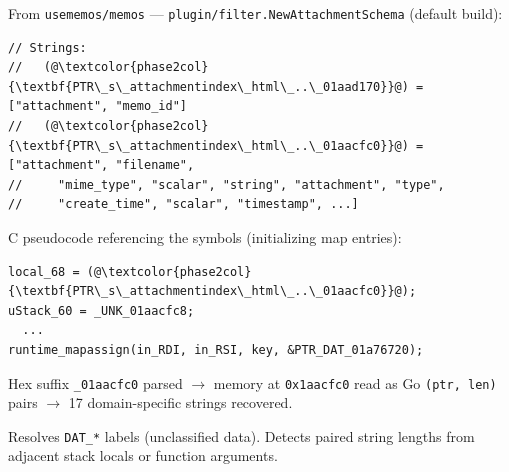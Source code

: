\documentclass[border=10pt]{standalone}
\newcommand{\phasegap}{\vspace{8pt}}
\begin{document}
\begin{varwidth}{16cm}
\begin{tcolorbox}
\tcblower

{\scriptsize\sffamily\color{labelgray} From \texttt{usememos/memos} --- \texttt{plugin/filter.NewAttachmentSchema} (default build):}
\vspace{2pt}
\begin{lstlisting}[style=annot]
// Strings:
//   (@\textcolor{phase2col}{\textbf{PTR\_s\_attachmentindex\_html\_..\_01aad170}}@) = ["attachment", "memo_id"]
//   (@\textcolor{phase2col}{\textbf{PTR\_s\_attachmentindex\_html\_..\_01aacfc0}}@) = ["attachment", "filename",
//     "mime_type", "scalar", "string", "attachment", "type",
//     "create_time", "scalar", "timestamp", ...]
\end{lstlisting}
\vspace{2pt}
{\scriptsize\sffamily\color{labelgray} C pseudocode referencing the symbols (initializing map entries):}
\begin{lstlisting}[style=cstyle]
local_68 = (@\textcolor{phase2col}{\textbf{PTR\_s\_attachmentindex\_html\_..\_01aacfc0}}@);
uStack_60 = _UNK_01aacfc8;
  ...
runtime_mapassign(in_RDI, in_RSI, key, &PTR_DAT_01a76720);
\end{lstlisting}
{\scriptsize\sffamily\color{labelgray} Hex suffix \texttt{\_01aacfc0} parsed $\to$ memory at \texttt{0x1aacfc0} read as Go \texttt{(ptr, len)} pairs $\to$ 17 domain-specific strings recovered.}
\end{tcolorbox}

\phasegap

\begin{tcolorbox}[
    title={\sffamily\bfseries Heuristic 3: DAT Symbols},
    colframe=phase3col, colback=codebg, colbacktitle=phase3col!15!white,
    coltitle=phase3col, fonttitle=\small,
    width=16cm, boxrule=0.5pt, left=3pt, right=3pt, top=2pt, bottom=2pt,
    subtitle style={colback=phase3col!8!white, coltitle=phase3col},
]
\small\sffamily Resolves \texttt{DAT\_*} labels (unclassified data).
Detects paired string lengths from adjacent stack locals or function arguments.

\tcblower


\end{tcolorbox}
\end{varwidth}
\end{document}
